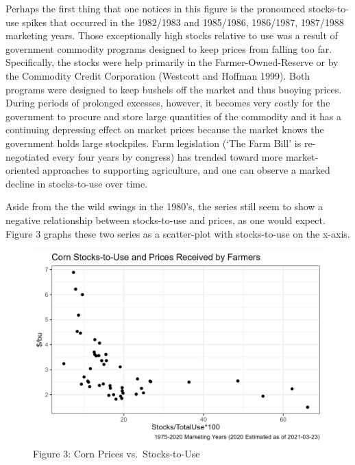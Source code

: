 \documentclass[
  letterpaper,
  DIV=11,
  numbers=noendperiod]{scrreprt}
\begin{document}
Perhaps the first thing that one notices in this figure is the
pronounced stocks-to-use spikes that occurred in the 1982/1983 and
1985/1986, 1986/1987, 1987/1988 marketing years. Those exceptionally
high stocks relative to use was a result of government commodity
programs designed to keep prices from falling too far. Specifically, the
stocks were help primarily in the Farmer-Owned-Reserve or by the
Commodity Credit Corporation (Westcott and Hoffman 1999). Both programs
were designed to keep bushels off the market and thus buoying prices.
During periods of prolonged excesses, however, it becomes very costly
for the government to procure and store large quantities of the
commodity and it has a continuing depressing effect on market prices
because the market knows the government holds large stockpiles. Farm
legislation (`The Farm Bill' is re-negotiated every four years by
congress) has trended toward more market-oriented approaches to
supporting agriculture, and one can observe a marked decline in
stocks-to-use over time.

Aside from the the wild swings in the 1980's, the series still seem to
show a negative relationship between stocks-to-use and prices, as one
would expect. Figure 3 graphs these two series as a scatter-plot with
stocks-to-use on the x-axis.

\begin{figure}

{\centering \includegraphics{assets/EndingStocksand-StocksUsePrices2.png}

}

\caption{Figure 3: Corn Prices vs.~Stocks-to-Use}

\end{figure}
\end{document}
